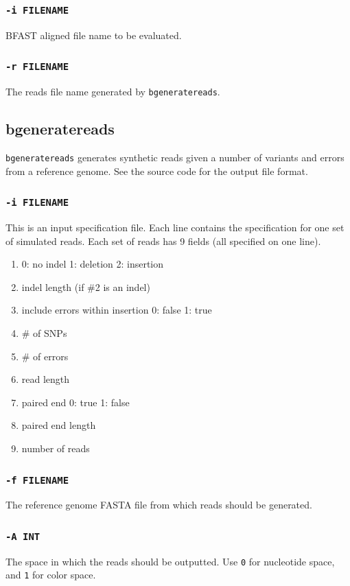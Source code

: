 \documentclass[a4paper,12pt]{book}
\newcommand{\TT}[1]{{\tt #1}} %
\newcommand{\rGFF}{reference genome FASTA file}
\newcommand{\BAF}{BFAST aligned file} %
\begin{document}
\subsubsection{\TT{-i FILENAME}}
\BAF{} name to be evaluated.

\subsubsection{\TT{-r FILENAME}}
The reads file name generated by \TT{bgeneratereads}.

\subsection{bgeneratereads}
\label{sec:bgeneratereads}
\TT{bgeneratereads} generates synthetic reads given a number of variants and errors from a reference genome.
See the source code for the output file format.

\subsubsection{\TT{-i FILENAME}}
This is an input specification file.
Each line contains the specification for one set of simulated reads.
Each set of reads has 9 fields (all specified on one line).
\begin{enumerate}
	\item 0: no indel 1: deletion 2: insertion
	\item indel length (if \#2 is an indel)
	\item include errors within insertion 0: false 1: true
	\item \# of SNPs
	\item \# of errors
	\item read length
	\item paired end 0: true 1: false
	\item paired end length
	\item number of reads
\end{enumerate}

\subsubsection{\TT{-f FILENAME}}
The \rGFF{} from which reads should be generated.

\subsubsection{\TT{-A INT}}
The space in which the reads should be outputted.
Use \TT{0} for nucleotide space, and \TT{1} for color space.
\end{document}

